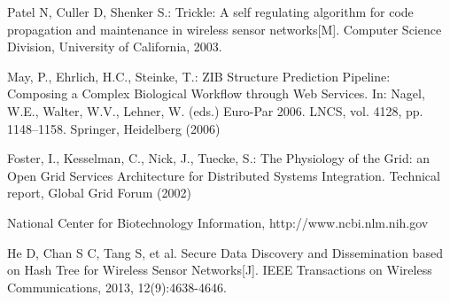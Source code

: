 \documentclass{sig-alternate-05-2015}
\begin{document}
\begin{thebibliography}{13}
Patel N, Culler D, Shenker S.: Trickle: A self regulating algorithm for code propagation and maintenance in wireless sensor networks[M]. Computer Science Division, University of California, 2003.

 May, P., Ehrlich, H.C., Steinke, T.: ZIB Structure Prediction Pipeline:
Composing a Complex Biological Workflow through Web Services. In: Nagel,
W.E., Walter, W.V., Lehner, W. (eds.) Euro-Par 2006. LNCS, vol. 4128,
pp. 1148--1158. Springer, Heidelberg (2006)

 Foster, I., Kesselman, C., Nick, J., Tuecke, S.: The Physiology of the
Grid: an Open Grid Services Architecture for Distributed Systems
Integration. Technical report, Global Grid Forum (2002)

 National Center for Biotechnology Information, http://www.ncbi.nlm.nih.gov

He D, Chan S C, Tang S, et al. Secure Data Discovery and Dissemination based on Hash Tree for Wireless Sensor Networks[J]. IEEE Transactions on Wireless Communications, 2013, 12(9):4638-4646.
\end{thebibliography}
\end{document}
